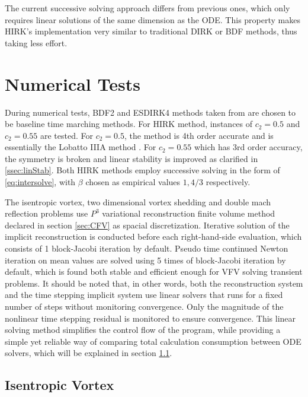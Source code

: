 \documentclass[preprint,12pt]{elsarticle}
\begin{document}
The current successive solving approach
differs from previous ones,
which only requires linear solutions of
the same dimension as the ODE.
This property makes HIRK's implementation
very similar to traditional DIRK or BDF methods,
thus taking less effort.





\section{Numerical Tests}

During numerical tests,
BDF2 and ESDIRK4 methods taken from
\cite{bijl2002implicitBDFvESDIRK,kennedy2003additiveARK}
are chosen to be
baseline time marching methods.
For HIRK method, instances of
$c_2 = 0.5$ and $c_2 = 0.55$ are tested.
For $c_2 = 0.5$, the method is 4th order accurate and
is essentially the Lobatto IIIA method \cite{wanner1996solving}.
For $c_2 = 0.55$ which has 3rd order accuracy,
the symmetry is broken and linear stability is
improved as clarified in \ref{ssec:linStab}.
Both HIRK methods employ successive
solving in the form of \eqref{eq:intersolve},
with $\beta$ chosen as empirical values $1,4/3$ respectively.


The isentropic vortex, two dimensional vortex shedding
and  double mach reflection problems use
$P^3$ variational reconstruction finite volume method declared in
section \ref{sec:CFV} as spacial discretization.
Iterative solution of the implicit reconstruction
is conducted before each right-hand-side evaluation,
which consists of 1 block-Jacobi iteration by default.
Pseudo time continued Newton iteration on mean values are
solved using 5 times of block-Jacobi iteration by default,
which is found both stable and efficient enough for VFV solving
transient problems.
It should be noted that, in other words,
both the reconstruction system and
the time stepping implicit system use linear solvers that
runs for a fixed number of steps without monitoring convergence.
Only the magnitude of the nonlinear time stepping residual
is monitored to ensure convergence.
This linear solving method simplifies the control flow of
the program,
while providing a simple yet reliable way of
comparing total calculation consumption between ODE solvers,
which will be explained in section \ref{ssec:resultIV}.



\subsection{Isentropic Vortex}
\label{ssec:resultIV}
\end{document}

